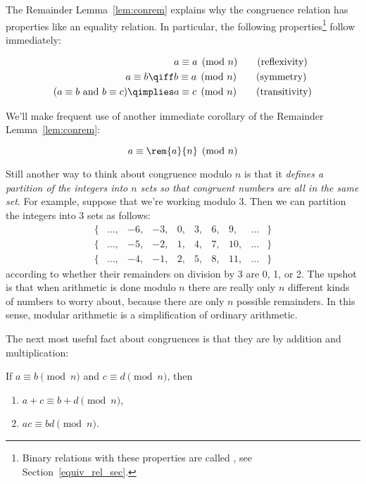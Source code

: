 The Remainder Lemma~\ref{lem:conrem} explains why the congruence
relation has properties like an equality relation.  In particular, the
following properties\footnote{Binary relations with these properties
  are called \emph{}, see
  Section~\ref{equiv_rel_sec}.}  follow immediately:
\begin{lemma}\label{mod_equiv_rel_lem} \mbox{}
\begin{align}
                 & a \equiv a \pmod{n}\tag{reflexivity}\\
a \equiv b
  \qiff & b \equiv a \pmod{n} \tag{symmetry}\\
(a \equiv b \text{ and
  } b \equiv c) \qimplies & a \equiv c \pmod{n} \tag{transitivity}
\end{align}
\end{lemma}

We'll make frequent use of another immediate corollary of the
Remainder Lemma~\ref{lem:conrem}:
\begin{corollary}\label{aran}
\[
a \equiv \rem{a}{n} \pmod{n}
\]
\end{corollary}

Still another way to think about congruence modulo $n$ is that it
\emph{defines a partition of the integers into $n$ sets so that
  congruent numbers are all in the same set}.  For example, suppose
that we're working modulo 3.  Then we can partition the integers into
3 sets as follows:
\[
\begin{array}{cccccccccc}
\{ & \dots, & -6, & -3, & 0, & 3, & 6, & 9, & \dots & \} \\
\{ &
\dots, & -5, & -2, & 1, & 4, & 7, & 10, & \dots & \} \\
\{ & \dots, &
-4, & -1, & 2, & 5, & 8, & 11, & \dots & \}
\end{array}
\]
according to whether their remainders on division by 3 are 0, 1, or 2.
The upshot is that when arithmetic is done modulo $n$ there are really
only $n$ different kinds of numbers to worry about, because there are
only $n$ possible remainders.  In this sense, modular arithmetic is a
simplification of ordinary arithmetic.\iffalse and thus is a good
reasoning tool.\fi

The next most useful fact about congruences is that they are
 by addition and multiplication:

\begin{lemma}[Congruence]\label{mod_congruence_lem}  If
$a \equiv b \pmod{n}$ and $c \equiv d \pmod{n}$, then
\begin{enumerate}
\item $a + c \equiv b + d \pmod{n}$,\label{mod_congruence_lem+}
\item $a c \equiv b d \pmod{n}$.\label{mod_congruence_lem*}
\end{enumerate}
\end{lemma}

